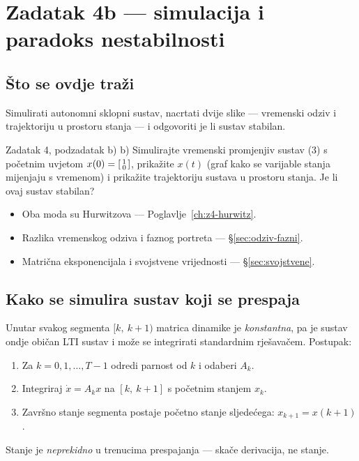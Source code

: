 \chapter{Zadatak 4b --- simulacija i paradoks nestabilnosti}
\label{ch:z4-simulacija}

\section{Što se ovdje traži}

Simulirati autonomni sklopni sustav, nacrtati dvije slike --- vremenski odziv i
trajektoriju u prostoru stanja --- i odgovoriti je li sustav stabilan.

\begin{zadatak}{Zadatak 4, podzadatak b)}
b) Simulirajte vremenski promjenjiv sustav (3) s početnim uvjetom
$x(0) = \begin{bsmallmatrix} 1 \\ 0 \end{bsmallmatrix}$, prikažite $x(t)$ (graf
kako se varijable stanja mijenjaju s vremenom) i prikažite trajektoriju sustava u
prostoru stanja. Je li ovaj sustav stabilan?
\end{zadatak}

\begin{predznanje}
\begin{itemize}[nosep,leftmargin=*]
  \item Oba moda su Hurwitzova --- Poglavlje~\ref{ch:z4-hurwitz}.
  \item Razlika vremenskog odziva i faznog portreta --- \S\ref{sec:odziv-fazni}.
  \item Matrična eksponencijala i svojstvene vrijednosti --- \S\ref{sec:svojstvene}.
\end{itemize}
\end{predznanje}

\section{Kako se simulira sustav koji se prespaja}
\label{sec:z4-kako-simulirati}

\begin{korak}
Unutar svakog segmenta $[k,\ k+1)$ matrica dinamike je \emph{konstantna}, pa je
sustav ondje običan LTI sustav i može se integrirati standardnim rješavačem.
Postupak:
\begin{enumerate}[leftmargin=*]
  \item Za $k = 0, 1, \dots, T-1$ odredi parnost od $k$ i odaberi $A_k$.
  \item Integriraj $\dot{x} = A_k x$ na $[k,\ k+1]$ s početnim stanjem $x_k$.
  \item Završno stanje segmenta postaje početno stanje sljedećega:
        $x_{k+1} = x(k+1)$.
\end{enumerate}
Stanje je \emph{neprekidno} u trenucima prespajanja --- skače derivacija, ne
stanje.
\end{korak}

